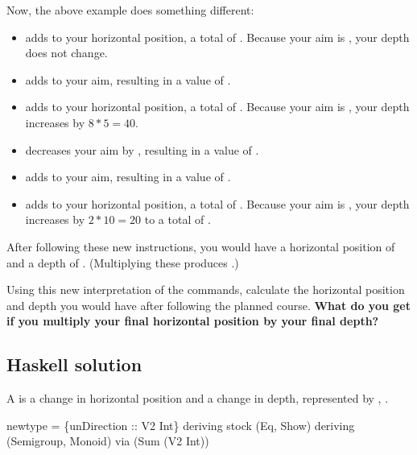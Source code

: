 Now, the above example does something different:
\begin{itemize}
\item {\Tt{}\nwendquote} adds  to your horizontal position, a total of . Because your aim is , your depth does not change.
\item {\Tt{}\nwendquote} adds  to your aim, resulting in a value of .
\item {\Tt{}\nwendquote} adds  to your horizontal position, a total of . Because your aim is , your depth increases by $8*5=40$.
\item {\Tt{}\nwendquote} decreases your aim by , resulting in a value of .
\item {\Tt{}\nwendquote} adds  to your aim, resulting in a value of .
\item {\Tt{}\nwendquote} adds  to your horizontal position, a total of . Because your aim is , your depth increases by $2*10=20$ to a total of .
\end{itemize}

After following these new instructions, you would have a horizontal position of  and a depth of . (Multiplying these produces .)

Using this new interpretation of the commands, calculate the horizontal position and depth you would have after following the planned course. \textbf{What do you get if you multiply your final horizontal position by your final depth?}
\nwenddocs{}\newpage
\subsection{Haskell solution}

A {\Tt{}\nwendquote} is a change in horizontal position and a change in depth,
represented by , .

\nwenddocs{}\endmoddef\nwstartdeflinemarkup{}\nwenddeflinemarkup
newtype  =  \{unDirection :: V2 Int\}
  deriving stock (Eq, Show)
  deriving
    (Semigroup, Monoid)
    via (Sum (V2 Int))

